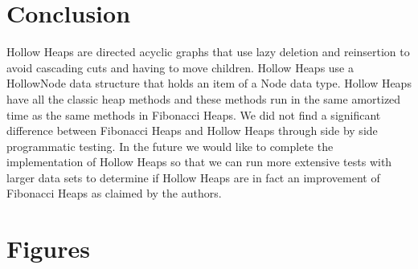 \documentclass[letter,10pt]{article}
\begin{document}
\medskip

\section{Conclusion}
\quad Hollow Heaps are directed acyclic graphs that use lazy deletion and reinsertion to avoid cascading cuts and having to move children. Hollow Heaps use a HollowNode data structure that holds an item of a Node data type. Hollow Heaps have all the classic heap methods and these methods run in the same amortized time as the same methods in Fibonacci Heaps. We did not find a significant difference between Fibonacci Heaps and Hollow Heaps through side by side programmatic testing. In the future we would like to complete the implementation of Hollow Heaps so that we can run more extensive tests with larger data sets to determine if Hollow Heaps are in fact an improvement of Fibonacci Heaps as claimed by the authors. 

\newpage
\section{Figures}
\end{document}
